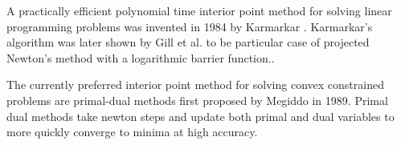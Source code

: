 \documentclass[a4paper,10pt]{article}
\begin{document}
A practically efficient polynomial time interior point method for solving linear
programming problems was invented in 1984 by Karmarkar \cite{karmarkar1984new}.
Karmarkar's algorithm was later shown by Gill et al. to be particular case of
projected Newton's method with a logarithmic barrier function.\cite{gill1986projected}.

The currently preferred interior point method for solving convex constrained
problems are primal-dual methods first proposed by Megiddo in
1989\cite{megiddo1989pathways}. Primal dual methods take newton steps and update
both primal and dual variables to more quickly converge to minima at high
accuracy.




\end{document}
